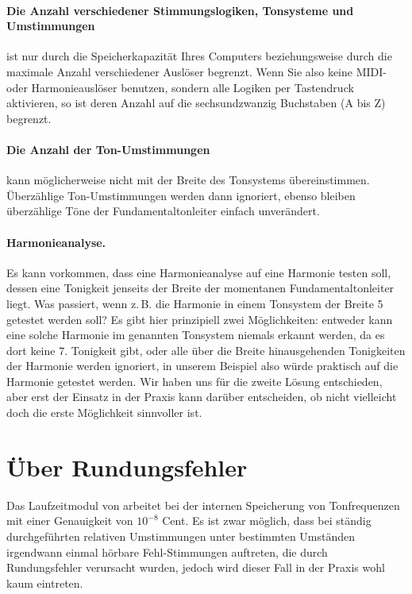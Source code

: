 \paragraph{Die Anzahl verschiedener Stimmungslogiken, Tonsysteme und
Umstimmungen} ist nur durch die Speicherkapazität Ihres Computers
beziehungsweise durch die maximale Anzahl verschiedener Auslöser
begrenzt. Wenn Sie also keine MIDI- oder Harmonieauslöser benutzen,
sondern alle Logiken per Tastendruck aktivieren, so ist deren Anzahl
auf die sechsundzwanzig Buchstaben (A bis Z) begrenzt.

\paragraph{Die Anzahl der Ton-Umstimmungen} kann möglicherweise
nicht mit der Breite des Tonsystems übereinstimmen. Überzählige
Ton-Umstimmungen werden dann ignoriert, ebenso bleiben
überzählige Töne der Fundamentaltonleiter einfach unverändert.

\paragraph{Harmonieanalyse.} Es kann vorkommen, dass eine
Harmonieanalyse auf eine Harmonie testen soll, dessen eine
Tonigkeit jenseits der Breite der
momentanen Fundamentaltonleiter liegt. Was passiert, wenn z.\,B. die
Harmonie  in einem Tonsystem der Breite 5
getestet werden soll? Es gibt hier prinzipiell zwei Möglichkeiten:
entweder kann eine solche Harmonie im genannten Tonsystem niemals
erkannt werden, da es dort keine 7. Tonigkeit gibt, oder alle über die
Breite hinausgehenden Tonigkeiten der Harmonie werden ignoriert, in
unserem Beispiel also würde praktisch auf die Harmonie  getestet werden. Wir haben uns für die zweite Lösung entschieden,
aber erst der Einsatz in der Praxis kann darüber entscheiden, ob nicht
vielleicht doch die erste Möglichkeit sinnvoller ist.

\section{Über Rundungsfehler}\label{sec:uber-rundungsfehler}
Das Laufzeitmodul von \mutabor{} arbeitet bei der internen Speicherung
von Tonfrequenzen mit einer Genauigkeit von $10^{-8}$ Cent. Es ist
zwar möglich, dass bei ständig durchgeführten relativen Umstimmungen
unter bestimmten Umständen irgendwann einmal hörbare Fehl-Stimmungen
auftreten, die durch Rundungsfehler verursacht wurden, jedoch wird
dieser Fall in der Praxis wohl kaum eintreten.


